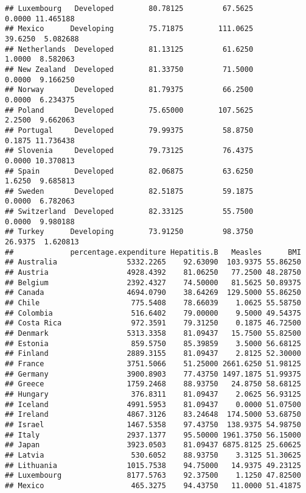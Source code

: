 \documentclass[
]{article}
\begin{document}
\begin{verbatim}
## Luxembourg   Developed        80.78125         67.5625        0.0000 11.465188
## Mexico      Developing        75.71875        111.0625       39.6250  5.082688
## Netherlands  Developed        81.13125         61.6250        1.0000  8.582063
## New Zealand  Developed        81.33750         71.5000        0.0000  9.166250
## Norway       Developed        81.79375         66.2500        0.0000  6.234375
## Poland       Developed        75.65000        107.5625        2.2500  9.662063
## Portugal     Developed        79.99375         58.8750        0.1875 11.736438
## Slovenia     Developed        79.73125         76.4375        0.0000 10.370813
## Spain        Developed        82.06875         63.6250        1.6250  9.685813
## Sweden       Developed        82.51875         59.1875        0.0000  6.782063
## Switzerland  Developed        82.33125         55.7500        0.0000  9.980188
## Turkey      Developing        73.91250         98.3750       26.9375  1.620813
##             percentage.expenditure Hepatitis.B   Measles      BMI
## Australia                5332.2265    92.63090  103.9375 55.86250
## Austria                  4928.4392    81.06250   77.2500 48.28750
## Belgium                  2392.4327    74.50000   81.5625 50.89375
## Canada                   4694.0790    38.64269  129.5000 55.86250
## Chile                     775.5408    78.66039    1.0625 55.58750
## Colombia                  516.6402    79.00000    9.5000 49.54375
## Costa Rica                972.3591    79.31250    0.1875 46.72500
## Denmark                  5313.3358    81.09437   15.7500 55.82500
## Estonia                   859.5750    85.39859    3.5000 56.68125
## Finland                  2889.3155    81.09437    2.8125 52.30000
## France                   3751.5066    51.25000 2661.6250 51.98125
## Germany                  3900.8903    77.43750 1497.1875 51.99375
## Greece                   1759.2468    88.93750   24.8750 58.68125
## Hungary                   376.8311    81.09437    2.0625 56.93125
## Iceland                  4991.5953    81.09437    0.0000 51.07500
## Ireland                  4867.3126    83.24648  174.5000 53.68750
## Israel                   1467.5358    97.43750  138.9375 54.98750
## Italy                    2937.1377    95.50000 1961.3750 56.15000
## Japan                    3923.0503    81.09437 6875.8125 25.60625
## Latvia                    530.6052    88.93750    3.3125 51.30625
## Lithuania                1015.7538    94.75000   14.9375 49.23125
## Luxembourg               8177.5763    92.37500    1.1250 47.82500
## Mexico                    465.3275    94.43750   11.0000 51.41875

\end{verbatim}
\end{document}
